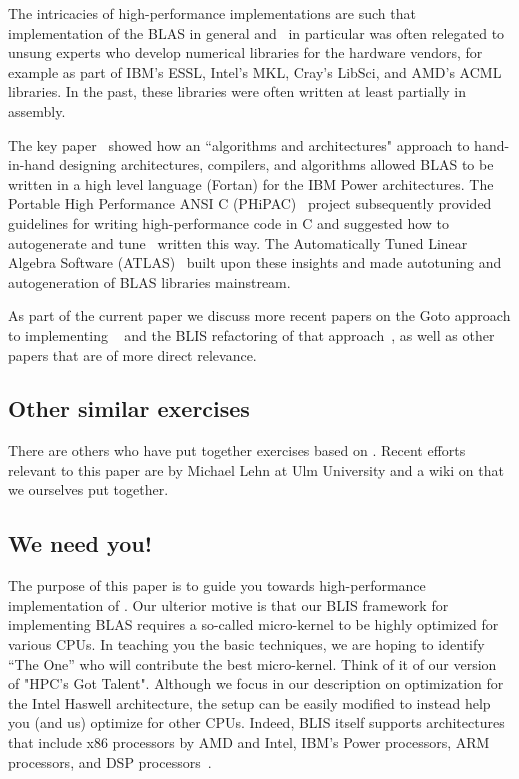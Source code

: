 The intricacies of high-performance implementations are such that implementation of the BLAS in general and \Gemm\ in particular was 
often relegated to 
unsung experts who develop numerical libraries for the hardware vendors, for example as part of IBM's ESSL, Intel's MKL, Cray's LibSci, and AMD's ACML libraries.  In the past,
these libraries were often written at least partially in assembly.
  
The key paper~\cite{IBM:P2} showed how an ``algorithms and architectures" approach to hand-in-hand designing architectures, compilers, and algorithms allowed 
BLAS to be written in a high level language (Fortan) for the IBM Power architectures.
The Portable High Performance ANSI C (PHiPAC)~\cite{PHiPAC97} project subsequently provided guidelines for writing high-performance code in C and suggested how to autogenerate and tune \Gemm\ written this way.  The Automatically Tuned Linear Algebra Software (ATLAS)~\cite{ATLAS,ATLAS_journal} built upon these insights and made autotuning and autogeneration of BLAS libraries mainstream.

As part of the current paper we discuss more recent papers on the Goto approach to implementing \Gemm~\cite{Goto:2008:AHP} and the BLIS refactoring of that approach~\cite{BLIS1}, as well as other papers that are of more direct relevance.  

\subsection{Other similar exercises}

There are others who have put together exercises based on {\Gemm}.
Recent efforts relevant to this paper are
by Michael Lehn at Ulm University and  a wiki on 
 that we ourselves put together.
 

\subsection{We need you!}

The purpose of this paper is to guide you towards high-performance
implementation of \Gemm.  Our ulterior motive is that our BLIS framework for implementing BLAS requires a so-called micro-kernel to be highly optimized for various CPUs.  In teaching you the basic techniques, we are hoping to identify  ``The One'' who will contribute the best micro-kernel.
Think of it of our version of "HPC's Got Talent".
Although  we focus in our description on optimization for the Intel Haswell architecture, the setup can be easily modified to instead help you (and us) optimize for other CPUs.  Indeed, BLIS itself supports architectures that include x86 processors by AMD and Intel, IBM's Power processors, ARM processors, and DSP processors~\cite{BLIS2,BLIS3,BLIS-TI}.
